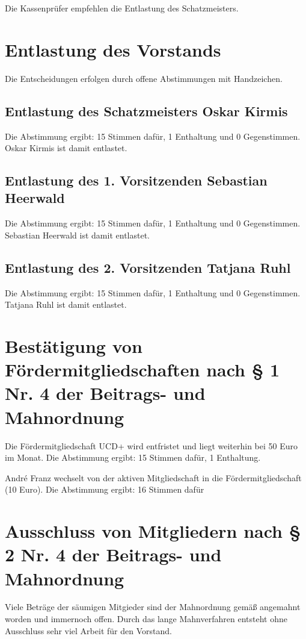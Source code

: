 \documentclass[a4paper,12pt,titlepage]{scrartcl}
\begin{document}
Die Kassenprüfer empfehlen die Entlastung des Schatzmeisters.

\section{Entlastung des Vorstands}

Die Entscheidungen erfolgen durch offene Abstimmungen mit Handzeichen.

\subsection{Entlastung des Schatzmeisters Oskar Kirmis}

Die Abstimmung ergibt: 15 Stimmen dafür, 1 Enthaltung und 0 Gegenstimmen. Oskar Kirmis ist damit entlastet.

\subsection{Entlastung des 1. Vorsitzenden Sebastian Heerwald}

Die Abstimmung ergibt: 15 Stimmen dafür, 1 Enthaltung und 0 Gegenstimmen. Sebastian Heerwald ist damit entlastet.

\subsection{Entlastung des 2. Vorsitzenden Tatjana Ruhl}
Die Abstimmung ergibt: 15 Stimmen dafür, 1 Enthaltung und 0 Gegenstimmen. Tatjana Ruhl ist damit entlastet.

\section{Bestätigung von Fördermitgliedschaften nach § 1 Nr. 4 der Beitrags- und Mahnordnung}

Die Fördermitgliedschaft UCD+ wird entfristet und liegt weiterhin bei 50 Euro im Monat.
Die Abstimmung ergibt: 15 Stimmen dafür, 1 Enthaltung.

André Franz wechselt von der aktiven Mitgliedschaft in die Fördermitgliedschaft (10 Euro). Die Abstimmung ergibt: 16 Stimmen dafür

\section{ Ausschluss von Mitgliedern nach § 2 Nr. 4 der Beitrags- und Mahnordnung }

Viele Beträge der säumigen Mitgieder sind der Mahnordnung gemäß angemahnt worden und immernoch offen. Durch das lange Mahnverfahren entsteht ohne Ausschluss sehr viel Arbeit für den Vorstand.
\end{document}
